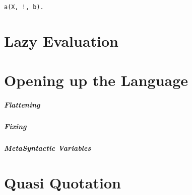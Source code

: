 \documentclass[thesis-solanki.tex]{subfiles}
\begin{document}
\begin{verbatim}
a(X, !, b).
\end{verbatim}














\section{Lazy Evaluation}







\section{Opening up the Language}

\subparagraph{Flattening}

\subparagraph{Fixing}

\subparagraph{MetaSyntactic Variables}






\section{Quasi Quotation}


\end{document}
